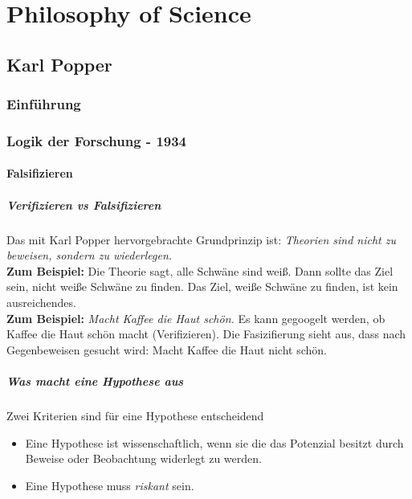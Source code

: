 \pagebreak
\chapter{Philosophy of Science} 
\setcounter{section}{0}

\section{Karl Popper}

\subsection{Einführung}



\subsection{Logik der Forschung - 1934}
\subsubsection{Falsifizieren}
\paragraph{Verifizieren vs Falsifizieren}
Das mit Karl Popper hervorgebrachte Grundprinzip ist: \textit{Theorien sind nicht zu beweisen, sondern zu wiederlegen.}\\

\textbf{Zum Beispiel:} Die Theorie sagt, alle Schwäne sind weiß. Dann sollte das Ziel sein, nicht weiße Schwäne zu finden. Das Ziel, weiße Schwäne zu finden, ist kein ausreichendes.\\

\textbf{Zum Beispiel:} \textit{Macht Kaffee die Haut schön.} Es kann gegoogelt werden, ob Kaffee die Haut schön macht (Verifizieren). Die Fasizifierung sieht aus, dass nach Gegenbeweisen gesucht wird: Macht Kaffee die Haut nicht schön.

\paragraph{Was macht eine Hypothese aus}
Zwei Kriterien sind für eine Hypothese entscheidend
\begin{itemize}
	\item Eine Hypothese ist wissenschaftlich, wenn sie die das Potenzial besitzt durch Beweise oder Beobachtung widerlegt zu werden.
	\item Eine Hypothese muss \textit{riskant} sein.
\end{itemize}


